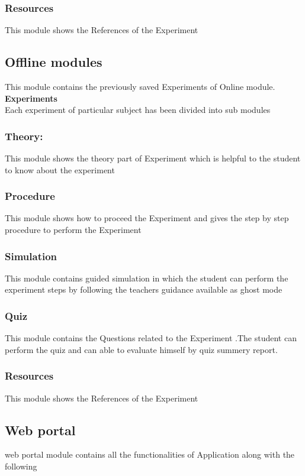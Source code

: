 \documentclass[12pt]{report}
\begin{document}
\subsubsection{Resources}
This module shows the References of the Experiment

\subsection{Offline modules}
This module contains the previously  saved Experiments of Online module.\\
\textbf{Experiments}\\
Each experiment of particular subject has been divided into sub modules 
\subsubsection{Theory:}
This module shows the theory part of Experiment which  is helpful to the student to know about the experiment

\subsubsection{Procedure}
This module shows how to proceed the Experiment and gives the step by step procedure to perform the Experiment 

\subsubsection{Simulation}
This module contains  guided simulation in which the student can 	perform the experiment steps by following the teachers guidance available as ghost mode

\subsubsection{Quiz}
This module contains the Questions related to the Experiment .The student can perform the quiz and can able to evaluate himself by quiz 	summery report.

\subsubsection{Resources}
This module shows the References of the Experiment

\subsection{Web portal}
web portal module contains all the functionalities of Application along with the following
\end{document}
